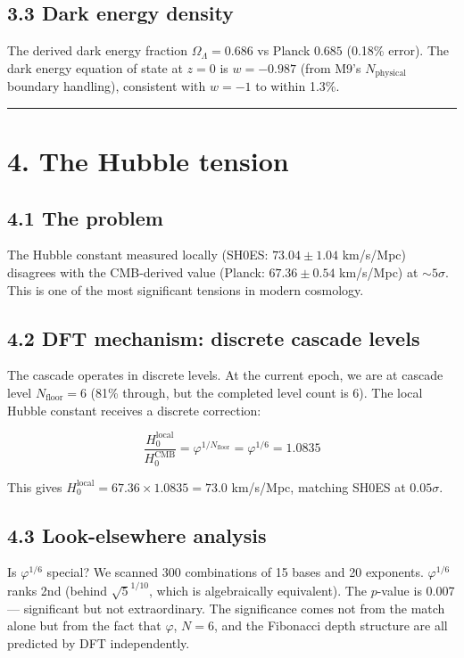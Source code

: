 \documentclass[11pt,a4paper]{article}
\begin{document}
\subsection*{3.3 Dark energy density}

The derived dark energy fraction $\Omega_{\Lambda} = 0.686$ vs Planck $0.685$ (0.18\% error). The dark energy equation of state at $z = 0$ is $w = -0.987$ (from M9's $N_{\text{physical}}$ boundary handling), consistent with $w = -1$ to within 1.3\%.

\begin{center}\rule{0.5\linewidth}{0.4pt}\end{center}

\section*{4. The Hubble tension}

\subsection*{4.1 The problem}

The Hubble constant measured locally (SH0ES: $73.04 \pm 1.04$ km/s/Mpc) disagrees with the CMB-derived value (Planck: $67.36 \pm 0.54$ km/s/Mpc) at $\sim 5\sigma$. This is one of the most significant tensions in modern cosmology.

\subsection*{4.2 DFT mechanism: discrete cascade levels}

The cascade operates in discrete levels. At the current epoch, we are at cascade level $N_{\text{floor}} = 6$ (81\% through, but the completed level count is 6). The local Hubble constant receives a discrete correction:

\[\frac{H_0^{\text{local}}}{H_0^{\text{CMB}}} = \varphi^{1/N_{\text{floor}}} = \varphi^{1/6} = 1.0835\]

This gives $H_0^{\text{local}} = 67.36 \times 1.0835 = 73.0$ km/s/Mpc, matching SH0ES at $0.05\sigma$.

\subsection*{4.3 Look-elsewhere analysis}

Is $\varphi^{1/6}$ special? We scanned 300 combinations of 15 bases and 20 exponents. $\varphi^{1/6}$ ranks 2nd (behind $\sqrt{5}^{1/10}$, which is algebraically equivalent). The $p$-value is 0.007 — significant but not extraordinary. The significance comes not from the match alone but from the fact that $\varphi$, $N = 6$, and the Fibonacci depth structure are all predicted by DFT independently.
\end{document}
